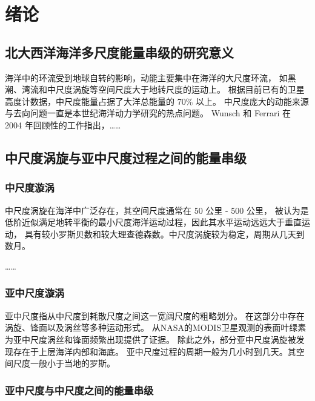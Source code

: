 \chapter{绪论}


\section{北大西洋海洋多尺度能量串级的研究意义}

海洋中的环流受到地球自转的影响，动能主要集中在海洋的大尺度环流，
如黑潮、湾流和中尺度涡旋等空间尺度大于地转尺度的运动上。
根据目前已有的卫星高度计数据，中尺度能量占据了大洋总能量的 70\% 以上。
中尺度庞大的动能来源与去向问题一直是本世纪海洋动力学研究的热点问题。
Wunsch 和 Ferrari 在 2004 年回顾性的工作指出\cite{Wunsch2004VERTICALME}，……


\section{中尺度涡旋与亚中尺度过程之间的能量串级}

\subsection{中尺度漩涡}

中尺度涡旋在海洋中广泛存在，其空间尺度通常在 50 公里 - 500 公里，
被认为是低阶近似满足地转平衡的最小尺度海洋运动过程，因此其水平运动远远大于垂直运动，
具有较小罗斯贝数和较大理查德森数。中尺度涡旋较为稳定，周期从几天到数月。

……

\subsection{亚中尺度漩涡}

亚中尺度指从中尺度到耗散尺度之间这一宽阔尺度的粗略划分。
在这部分中存在涡旋、锋面以及涡丝等多种运动形式。
从NASA的MODIS卫星观测的表面叶绿素为亚中尺度涡丝和锋面频繁出现提供了证据\cite{zhang2019influence}。
除此之外，部分亚中尺度涡旋被发现存在于上层海洋内部和海底。
亚中尺度过程的周期一般为几小时到几天\cite{mcwilliams2016submesoscale}。其空间尺度一般小于当地的罗斯。

\subsection{亚中尺度与中尺度之间的能量串级}


